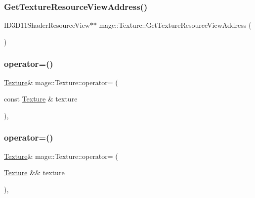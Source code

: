 \hypertarget{classmage_1_1_texture_a322ee2751dbd9ccfb245c6d481dfc803}{}\label{classmage_1_1_texture_a322ee2751dbd9ccfb245c6d481dfc803} 
\subsubsection{\texorpdfstring{Get\+Texture\+Resource\+View\+Address()}{GetTextureResourceViewAddress()}}
{\footnotesize\ttfamily I\+D3\+D11\+Shader\+Resource\+View$\ast$$\ast$ mage\+::\+Texture\+::\+Get\+Texture\+Resource\+View\+Address (\begin{DoxyParamCaption}{ }\end{DoxyParamCaption})}

\hypertarget{classmage_1_1_texture_a0b73b4df98d729c8f60e58b0ca065636}{}\label{classmage_1_1_texture_a0b73b4df98d729c8f60e58b0ca065636} 
\subsubsection{\texorpdfstring{operator=()}{operator=()}\hspace{0.1cm}{\footnotesize\ttfamily [1/2]}}
{\footnotesize\ttfamily \hyperlink{classmage_1_1_texture}{Texture}\& mage\+::\+Texture\+::operator= (\begin{DoxyParamCaption}\item[{const \hyperlink{classmage_1_1_texture}{Texture} \&}]{texture }\end{DoxyParamCaption})\hspace{0.3cm}{\ttfamily [private]}, {\ttfamily [delete]}}

\hypertarget{classmage_1_1_texture_a765e9cf3bddedbe2795dea0fe57245ff}{}\label{classmage_1_1_texture_a765e9cf3bddedbe2795dea0fe57245ff} 
\subsubsection{\texorpdfstring{operator=()}{operator=()}\hspace{0.1cm}{\footnotesize\ttfamily [2/2]}}
{\footnotesize\ttfamily \hyperlink{classmage_1_1_texture}{Texture}\& mage\+::\+Texture\+::operator= (\begin{DoxyParamCaption}\item[{\hyperlink{classmage_1_1_texture}{Texture} \&\&}]{texture }\end{DoxyParamCaption})\hspace{0.3cm}{\ttfamily [private]}, {\ttfamily [delete]}}



